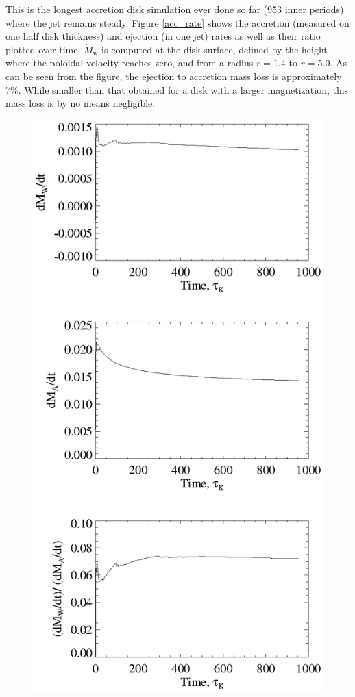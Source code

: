 \documentclass{aa}
\begin{document}
This is the longest accretion disk simulation ever done so far (953 inner periods) where the jet remains steady. Figure \ref{acc_rate} shows the accretion (measured on one half disk thickness) and
 ejection (in one jet) rates as well as their ratio plotted over time.  $\dot M_\mathrm{w}$ is computed at the disk surface, defined by the height where the poloidal velocity reaches zero, and from a radius
 $r=1.4$ to $r=5.0$. As can be seen from the figure, the ejection to accretion mass loss is approximately 7\%. While smaller than that obtained for a disk with a larger magnetization, this
 mass loss is by no means negligible.
\begin{figure}
   \centering 
   \includegraphics[width=\columnwidth]{12633f03.eps}

\end{figure}
\end{document}
